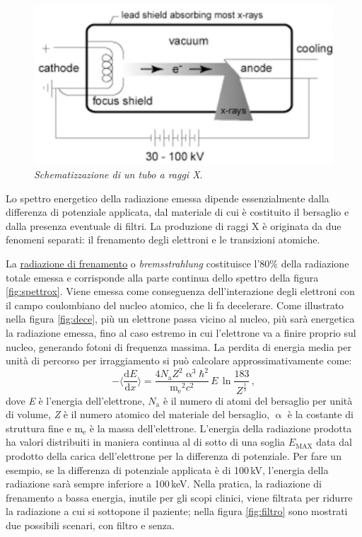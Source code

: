 \documentclass{report}
\newcommand{\figref}[1]{figura \ref{#1}}
\numberwithin{equation}{section}
\numberwithin{figure}{section}
\begin{document}
\begin{figure}[htp]
\centering
\includegraphics[scale=0.9]{immagini/tubox.png}
\caption{\label{fig:tubox} \textit{Schematizzazione di un tubo a raggi X}.}
\end{figure}

Lo spettro energetico della radiazione emessa dipende essenzialmente dalla differenza di potenziale applicata, dal materiale di cui è costituito il bersaglio e dalla presenza eventuale di filtri. La produzione di raggi X è originata da due fenomeni separati: il frenamento degli elettroni e le transizioni atomiche.

La \underline{radiazione di frenamento} o \textit{bremsstrahlung} costituisce l'80\% della radiazione totale emessa e corrisponde alla parte continua dello spettro della \figref{fig:spettrox}. Viene emessa come conseguenza dell'interazione degli elettroni con il campo coulombiano del nucleo atomico, che li fa decelerare. Come illustrato nella \figref{fig:dece}, più un elettrone passa vicino al nucleo, più sarà energetica la radiazione emessa, fino al caso estremo in cui l'elettrone va a finire proprio sul nucleo, generando fotoni di frequenza massima. La perdita di energia media per unità di percorso per irraggiamento si può calcolare approssimativamente come:
\begin{equation}
    - \Big\langle \frac{\mathrm{d}E}{\mathrm{d}x} \Big\rangle = \dfrac{4N_\mathrm{a} Z^2 \upalpha^3 \hbar^2}{\mathrm{m_e}^2 c^2}\,E\,\ln{\frac{183}{Z^{\frac{1}{3}}}}\,,
\end{equation}
dove \textit{E} è l'energia dell'elettrone, $N_\mathrm{a}$ è il numero di atomi del bersaglio per unità di volume, \textit{Z} è il numero atomico del materiale del bersaglio, $\upalpha$ è la costante di struttura fine e $\mathrm{m_e}$ è la massa dell'elettrone. L'energia della radiazione prodotta ha valori distribuiti in maniera continua al di sotto di una soglia $E_\mathrm{MAX}$ data dal prodotto della carica dell'elettrone per la differenza di potenziale. Per fare un esempio, se la differenza di potenziale applicata è di 100\,kV, l'energia della radiazione sarà sempre inferiore a 100\,keV. Nella pratica, la radiazione di frenamento a bassa energia, inutile per gli scopi clinici, viene filtrata per ridurre la radiazione a cui si sottopone il paziente; nella \figref{fig:filtro} sono mostrati due possibili scenari, con filtro e senza.
\end{document}
